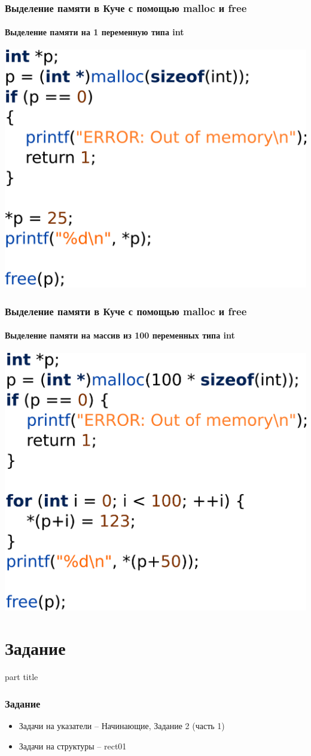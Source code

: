 \documentclass[14pt,pdf,hyperref={unicode}]{beamer}
\begin{document}
\begin{frame}[fragile]
\frametitle{Выделение памяти в Куче с помощью malloc и free} 
\framesubtitle{Выделение памяти на 1 переменную типа int} 
\begin{center}
\includegraphics[width=0.55\linewidth]{images/malloc_free_1.png}
\end{center}
\end{frame}

\begin{frame}[fragile]
\frametitle{Выделение памяти в Куче с помощью malloc и free} 
\framesubtitle{Выделение памяти на массив из 100 переменных типа int} 
\begin{center}
\includegraphics[width=0.55\linewidth]{images/malloc_free_2.png}
\end{center}
\end{frame}

\section{Задание}
\begin{frame}
\begin{center}
\begin{beamercolorbox}[sep=8pt,center]{part
title}
\insertsection
\end{beamercolorbox}
\end{center}
\end{frame}

\begin{frame}[fragile]
\frametitle{Задание} 
\begin{itemize}
\item Задачи на указатели -- Начинающие, Задание 2 (часть 1)
\item Задачи на структуры -- rect01
\end{itemize}
\end{frame}
\end{document}
